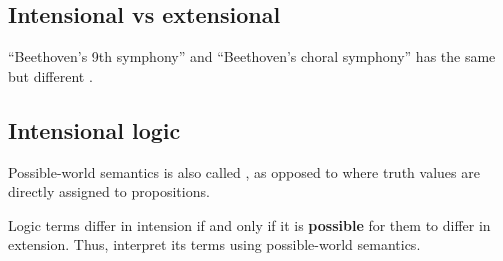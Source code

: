 \subsection{Intensional vs extensional}

``Beethoven's 9th symphony'' and ``Beethoven's choral symphony'' has the same  but different .

\subsection{Intensional logic}

Possible-world semantics is also called , as opposed to  where truth values are directly assigned to propositions.

Logic terms differ in intension if and only if it is \textbf{possible} for them to differ in extension.  Thus,  interpret its terms using possible-world semantics.

